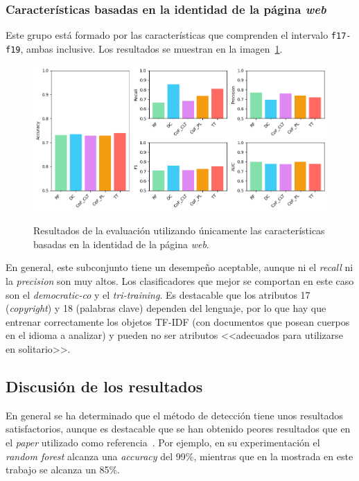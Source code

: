 \subsubsection{Características basadas en la identidad de la página \textit{web}}
Este grupo está formado por las características que comprenden el intervalo \texttt{f17-f19}, ambas inclusive. Los resultados se muestran en la imagen~\ref{gr:ph-f17f19_small}.

\begin{figure}[h]
	\caption[\textit{Phishing}: detección (\texttt{f17-f19})]{Resultados de la evaluación utilizando únicamente las características basadas en la identidad de la página \textit{web}.}
	\centering
	\includegraphics[width=\textwidth]{../img/memoria/5_phishing/f17f19_big}
	\label{gr:ph-f17f19_small}
\end{figure}

En general, este subconjunto tiene un desempeño aceptable, aunque ni el \textit{recall} ni la \textit{precision} son muy altos. Los clasificadores que mejor se comportan en este caso son el \textit{democratic-co} y el \textit{tri-training}. Es destacable que los atributos 17 (\textit{copyright}) y 18 (palabras clave) dependen del lenguaje, por lo que hay que entrenar correctamente los objetos TF-IDF (con documentos que posean cuerpos en el idioma a analizar) y pueden no ser atributos <<adecuados para utilizarse en solitario>>.


\subsection{Discusión de los resultados}

En general se ha determinado que el método de detección tiene unos resultados satisfactorios, aunque es destacable que se han obtenido peores resultados que en el \textit{paper} utilizado como referencia~\cite{featuresPhishing2018Gupta}. Por ejemplo, en su experimentación el \textit{random forest} alcanza una \textit{accuracy} del 99\%, mientras que en la mostrada en este trabajo se alcanza un 85\%.

